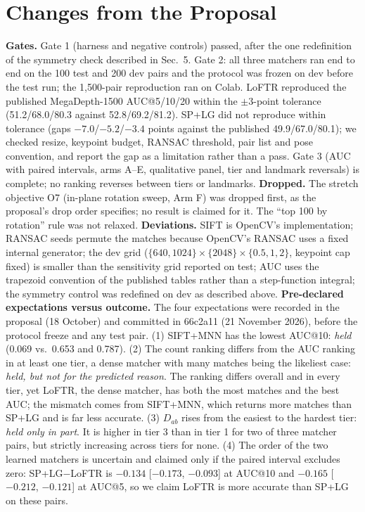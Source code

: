 \documentclass[10pt,twocolumn,letterpaper]{article}
\begin{document}
\section{Changes from the Proposal} \label{sec:expect}
\textbf{Gates.} Gate 1 (harness and negative controls) passed, after the one redefinition of the symmetry check described in Sec.~5. Gate 2: all three matchers ran end to end on the 100 test and 200 dev pairs and the protocol was frozen on dev before the test run; the 1,500-pair reproduction ran on Colab. LoFTR reproduced the published MegaDepth-1500 AUC@5/10/20 within the $\pm3$-point tolerance (51.2/68.0/80.3 against 52.8/69.2/81.2). SP+LG did not reproduce within tolerance (gaps $-7.0$/$-5.2$/$-3.4$ points against the published 49.9/67.0/80.1); we checked resize, keypoint budget, RANSAC threshold, pair list and pose convention, and report the gap as a limitation rather than a pass. Gate 3 (AUC with paired intervals, arms A--E, qualitative panel, tier and landmark reversals) is complete; no ranking reverses between tiers or landmarks.
\textbf{Dropped.} The stretch objective O7 (in-plane rotation sweep, Arm F) was dropped first, as the proposal's drop order specifies; no result is claimed for it. The ``top 100 by rotation'' rule was not relaxed.
\textbf{Deviations.} SIFT is OpenCV's implementation; RANSAC seeds permute the matches because OpenCV's RANSAC uses a fixed internal generator; the dev grid ($\{640,1024\}\times\{2048\}\times\{0.5,1,2\}$, keypoint cap fixed) is smaller than the sensitivity grid reported on test; AUC uses the trapezoid convention of the published tables rather than a step-function integral; the symmetry control was redefined on dev as described above.
\textbf{Pre-declared expectations versus outcome.} The four expectations were recorded in the proposal (18 October) and committed in 66c2a11 (21 November 2026), before the protocol freeze and any test pair. (1) SIFT+MNN has the lowest AUC@10: \emph{held} (0.069 vs.\ 0.653 and 0.787). (2) The count ranking differs from the AUC ranking in at least one tier, a dense matcher with many matches being the likeliest case: \emph{held, but not for the predicted reason}. The ranking differs overall and in every tier, yet LoFTR, the dense matcher, has both the most matches and the best AUC; the mismatch comes from SIFT+MNN, which returns more matches than SP+LG and is far less accurate. (3) $D_{ab}$ rises from the easiest to the hardest tier: \emph{held only in part}. It is higher in tier 3 than in tier 1 for two of three matcher pairs, but strictly increasing across tiers for none. (4) The order of the two learned matchers is uncertain and claimed only if the paired interval excludes zero: SP+LG$-$LoFTR is $-0.134$ [$-0.173$, $-0.093$] at AUC@10 and $-0.165$ [$-0.212$, $-0.121$] at AUC@5, so we claim LoFTR is more accurate than SP+LG on these pairs.
\end{document}
